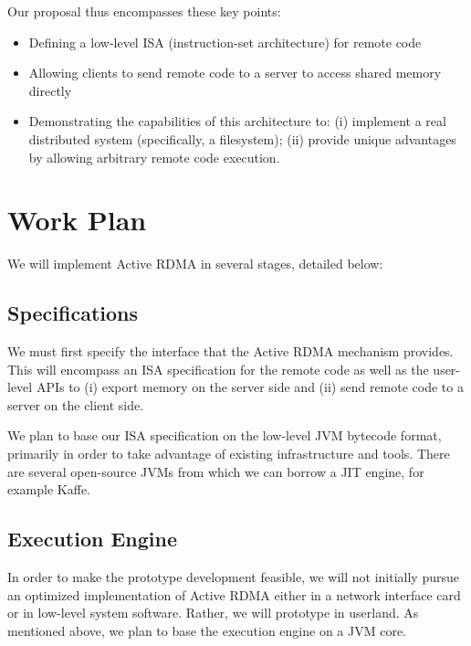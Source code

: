 \documentclass[10pt]{article}
\begin{document}
Our proposal thus encompasses these key points:

\begin{itemize} \itemsep -2pt

\item Defining a low-level ISA (instruction-set architecture) for
  remote code

\item Allowing clients to send remote code to a server to access
  shared memory directly

\item Demonstrating the capabilities of this architecture to: (i)
  implement a real distributed system (specifically, a filesystem);
  (ii) provide unique advantages by allowing arbitrary remote code
  execution.

\end{itemize}

\section{Work Plan}

We will implement Active RDMA in several stages, detailed below:

\subsection{Specifications}

We must first specify the interface that the Active RDMA mechanism
provides. This will encompass an ISA specification for the remote code
as well as the user-level APIs to (i) export memory on the server side
and (ii) send remote code to a server on the client side.

We plan to base our ISA specification on the low-level JVM bytecode
format, primarily in order to take advantage of existing
infrastructure and tools. There are several open-source JVMs from
which we can borrow a JIT engine, for example Kaffe.

\subsection{Execution Engine}

In order to make the prototype development feasible, we will not
initially pursue an optimized implementation of Active RDMA either in
a network interface card or in low-level system software. Rather, we
will prototype in userland. As mentioned above, we plan to base the
execution engine on a JVM core.
\end{document}
